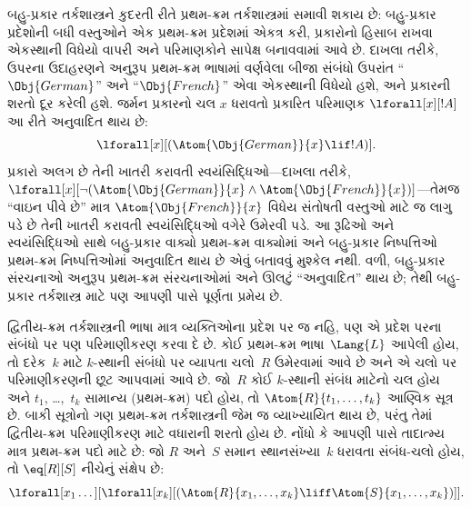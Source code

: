 બહુ-પ્રકાર તર્કશાસ્ત્રને કુદરતી રીતે પ્રથમ-ક્રમ તર્કશાસ્ત્રમાં સમાવી
શકાય છે: બહુ-પ્રકાર પ્રદેશોની બધી વસ્તુઓને એક પ્રથમ-ક્રમ
પ્રદેશમાં એકત્ર કરી, પ્રકારોનો હિસાબ રાખવા એકસ્થાની વિધેયો
વાપરી અને પરિમાણકોને સાપેક્ષ બનાવવામાં આવે છે. દાખલા તરીકે, ઉપરના
ઉદાહરણને અનુરૂપ પ્રથમ-ક્રમ ભાષામાં વર્ણવેલા બીજા સંબંધો ઉપરાંત
``$\Obj{German}$'' અને ``$\Obj{French}$'' એવા એકસ્થાની વિધેયો
હશે, અને પ્રકારની શરતો દૂર કરેલી હશે. જર્મન પ્રકારનો ચલ
$x$ ધરાવતો પ્રકારિત પરિમાણક $\lforall[x][!A]$ આ રીતે અનુવાદિત થાય છે:
\[
\lforall[x][(\Atom{\Obj{German}}{x} \lif !A)].
\]
પ્રકારો અલગ છે તેની ખાતરી કરાવતી સ્વયંસિદ્ધિઓ---દાખલા તરીકે,
$\lforall[x][\lnot (\Atom{\Obj{German}}{x} \land
  \Atom{\Obj{French}}{x})]$---તેમજ ``વાઇન પીવે છે'' માત્ર
$\Atom{\Obj{French}}{x}$ વિધેય સંતોષતી વસ્તુઓ માટે જ લાગુ પડે છે તેની
ખાતરી કરાવતી સ્વયંસિદ્ધિઓ વગેરે ઉમેરવી પડે. આ રૂઢિઓ અને સ્વયંસિદ્ધિઓ
સાથે બહુ-પ્રકાર વાક્યો પ્રથમ-ક્રમ વાક્યોમાં અને
બહુ-પ્રકાર નિષ્પત્તિઓ પ્રથમ-ક્રમ નિષ્પત્તિઓમાં અનુવાદિત થાય
છે એવું બતાવવું મુશ્કેલ નથી. વળી, બહુ-પ્રકાર સંરચનાઓ અનુરૂપ
પ્રથમ-ક્રમ સંરચનાઓમાં અને ઊલટું ``અનુવાદિત'' થાય છે; તેથી
બહુ-પ્રકાર તર્કશાસ્ત્ર માટે પણ આપણી પાસે પૂર્ણતા પ્રમેય છે.
\endgroup


\begingroup
\makeatletter{}\makeatother


\label{guunit:OLP-0177}


દ્વિતીય-ક્રમ તર્કશાસ્ત્રની ભાષા માત્ર વ્યક્તિઓના પ્રદેશ પર જ નહિ,
પણ એ પ્રદેશ પરના સંબંધો પર પણ પરિમાણીકરણ કરવા દે છે. કોઈ
પ્રથમ-ક્રમ ભાષા~$\Lang{L}$ આપેલી હોય, તો દરેક~$k$ માટે $k$-સ્થાની
સંબંધો પર વ્યાપતા ચલો~$R$ ઉમેરવામાં આવે છે અને એ ચલો પર
પરિમાણીકરણની છૂટ આપવામાં આવે છે. જો~$R$ કોઈ $k$-સ્થાની સંબંધ માટેનો
ચલ હોય અને $t_1$, \dots,~$t_k$ સામાન્ય (પ્રથમ-ક્રમ) પદો હોય,
તો $\Atom{R}{t_1,\dots,t_k}$ આણ્વિક સૂત્ર છે. બાકી સૂત્રોનો
ગણ પ્રથમ-ક્રમ તર્કશાસ્ત્રની જેમ જ વ્યાખ્યાયિત થાય છે, પરંતુ તેમાં
દ્વિતીય-ક્રમ પરિમાણીકરણ માટે વધારાની શરતો હોય છે. નોંધો કે આપણી પાસે
તાદાત્મ્ય માત્ર પ્રથમ-ક્રમ પદો માટે છે: જો $R$ અને~$S$ સમાન
સ્થાનસંખ્યા~$k$ ધરાવતા સંબંધ-ચલો હોય, તો $\eq[R][S]$ નીચેનું
સંક્ષેપ છે:
\[
\lforall[x_1 \dots][\lforall[x_k][(\Atom{R}{x_1, \dots, x_k} \liff
  \Atom{S}{x_1, \dots, x_k})]].
\]

